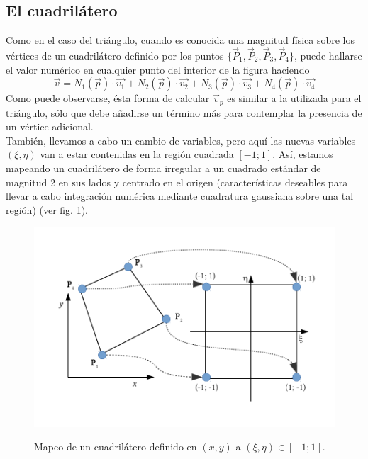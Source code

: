 \subsection{El cuadrilátero}
\label{sec:cuadrilatero}
Como en el caso del triángulo, cuando es conocida una magnitud física sobre los vértices de un cuadrilátero definido por los puntos $ \lbrace \vec{P}_{1}, \vec{P}_{2}, \vec{P}_{3}, \vec{P}_{4}  \rbrace $, puede hallarse el valor numérico en cualquier punto del interior de la figura haciendo
\begin{equation}
\label{eq:combinacionlinealcuaxy}  
  \vec{v} = 
  N_{1}(\vec{p}) \cdot \vec{v_1} + 
  N_{2}(\vec{p}) \cdot \vec{v_2} + 
  N_{3}(\vec{p}) \cdot \vec{v_3} +  
  N_{4}(\vec{p}) \cdot \vec{v_4} 
\end{equation} 
Como puede observarse, ésta forma de calcular $ \vec{v}_{p} $ es similar a la utilizada para el triángulo, sólo que debe añadirse un término más para contemplar la presencia de un vértice adicional.
\\
También, llevamos a cabo un cambio de variables, pero aquí las nuevas variables $(\xi, \eta)$ van a estar contenidas en la región cuadrada $[-1;1]$. Así, estamos mapeando un cuadrilátero de forma irregular a un cuadrado estándar de magnitud 2 en sus lados y centrado en el origen (características deseables para llevar a cabo integración numérica mediante cuadratura gaussiana sobre una tal región)  (ver fig. \ref{fig:cuad}). 

\begin{figure}
\centering
\includegraphics[scale=.8]{Cuadrilatero.pdf}
\caption{\label{fig:cuad} } Mapeo de un cuadrilátero definido en $(x,y)$ a $(\xi, \eta) \in [-1; 1]$.
\end{figure}

